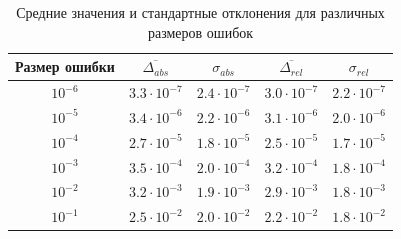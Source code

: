 \begin{table}[h]
   \centering
   \caption{Средние значения и стандартные отклонения для различных размеров ошибок}
   \begin{tabular}{|c|c|c|c|c|}
       \hline
       Размер ошибки & $\overline{\Delta_{abs}}$ & $\sigma_{abs}$ & $\overline{\Delta_{rel}}$ & $\sigma_{rel}$ \\
       \hline
       $10^{-6}$ & $3.3 \cdot 10^{-7}$ & $2.4 \cdot 10^{-7}$ & $3.0 \cdot 10^{-7}$ & $2.2 \cdot 10^{-7}$ \\
       \hline
       $10^{-5}$ & $3.4 \cdot 10^{-6}$ & $2.2 \cdot 10^{-6}$ & $3.1 \cdot 10^{-6}$ & $2.0 \cdot 10^{-6}$ \\
       \hline
       $10^{-4}$ & $2.7 \cdot 10^{-5}$ & $1.8 \cdot 10^{-5}$ & $2.5 \cdot 10^{-5}$ & $1.7 \cdot 10^{-5}$ \\
       \hline
       $10^{-3}$ & $3.5 \cdot 10^{-4}$ & $2.0 \cdot 10^{-4}$ & $3.2 \cdot 10^{-4}$ & $1.8 \cdot 10^{-4}$ \\
       \hline
       $10^{-2}$ & $3.2 \cdot 10^{-3}$ & $1.9 \cdot 10^{-3}$ & $2.9 \cdot 10^{-3}$ & $1.8 \cdot 10^{-3}$ \\
       \hline
       $10^{-1}$ & $2.5 \cdot 10^{-2}$ & $2.0 \cdot 10^{-2}$ & $2.2 \cdot 10^{-2}$ & $1.8 \cdot 10^{-2}$ \\
       \hline
   \end{tabular}
\end{table}


